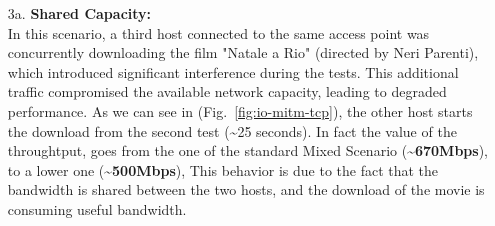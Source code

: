\begin{enumerate}

                
            \item[3a.] \textbf{Shared Capacity:} \\
                In this scenario, a third host connected to the same access point was concurrently downloading the film "Natale a Rio" (directed by Neri Parenti), which introduced significant interference during the tests. 
                This additional traffic compromised the available network capacity, leading to degraded performance.
                As we can see in (Fig.~\ref{fig:io-mitm-tcp}), the other host starts the download from the second test (\textasciitilde25 seconds). In fact the value of the throughtput, goes from the one of the standard Mixed Scenario (\textbf{\textasciitilde670Mbps}), to a lower one (\textbf{\textasciitilde500Mbps}),
                This behavior is due to the fact that the bandwidth is shared between the two hosts, and the download of the movie is consuming useful bandwidth.




\end{enumerate}
